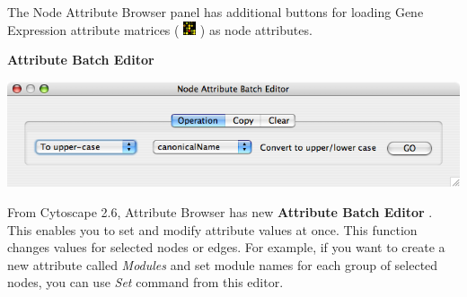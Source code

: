  The Node Attribute Browser panel has additional buttons for loading Gene
Expression attribute matrices (
\includegraphics[width=1em]{images/attributes_gene_expr_icon.png}  ) as node
attributes. 


 \textbf{Attribute Batch Editor}


 \includegraphics[width=\textwidth]{images/attribute_editor26.png} 


 From Cytoscape 2.6, Attribute Browser has new \textbf{Attribute Batch Editor}
. This enables you to set and modify attribute values at once. This function
changes values for selected nodes or edges. For example, if you want to create
a new attribute called \emph{Modules} and set module names for each group of
selected nodes, you can use \emph{Set} command from this editor. 
